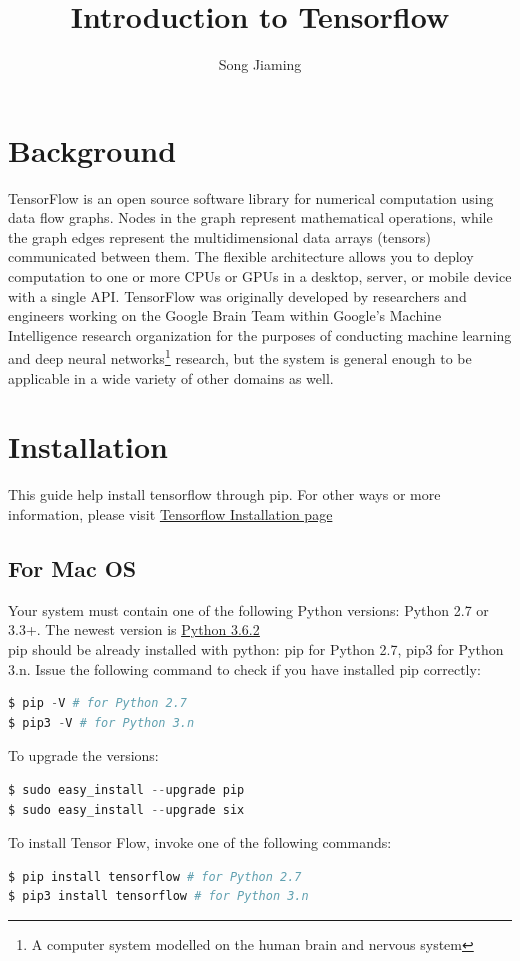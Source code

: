 \documentclass{article}
\title{Introduction to Tensorflow}
\date{}
\author{Song Jiaming}
\begin{document}
	\maketitle
	\tableofcontents
	\newpage
	\section{Background}
	TensorFlow is an open source software library for numerical computation using data flow graphs.
	Nodes in the graph represent mathematical operations, while the graph edges represent the multidimensional data arrays (tensors) communicated between them.
	The flexible architecture allows you to deploy computation to one or more CPUs or GPUs in a desktop, server, or mobile device with a single API.\medskip
	\newline
	TensorFlow was originally developed by researchers and engineers working on the Google Brain Team within Google's Machine Intelligence research organization for the purposes of conducting machine learning and deep neural networks\footnote{A computer system modelled on the human brain and nervous system} research, but the system is general enough to be applicable in a wide variety of other domains as well.


	\section{Installation}
	This guide help install tensorflow through pip. For other ways or more information, please visit \href{https://www.tensorflow.org/install/}{Tensorflow Installation page}	
	\subsection{For Mac OS}
	Your system must contain one of the following Python versions: Python 2.7 or 3.3+. The newest version is \href{https://www.python.org/downloads/release/python-362/}{\underline{Python 3.6.2}}\\
	 \colorbox{backcolour}{pip} should be already installed with python: \colorbox{backcolour}{pip} for Python 2.7, \colorbox{backcolour}{pip3} for Python 3.n. Issue the following command to check if you have installed pip correctly:
	\begin{lstlisting}[numbers=none,language=Python]
$ pip -V # for Python 2.7
$ pip3 -V # for Python 3.n		
\end{lstlisting}
To upgrade the versions:
	\begin{lstlisting}[numbers=none,language=Python]
$ sudo easy_install --upgrade pip
$ sudo easy_install --upgrade six
\end{lstlisting}
	To install Tensor Flow, invoke one of the following commands:
\begin{lstlisting}[numbers=none,language=Python]
$ pip install tensorflow # for Python 2.7
$ pip3 install tensorflow # for Python 3.n		
\end{lstlisting}
\end{document}
